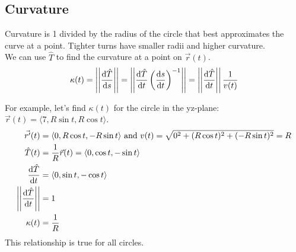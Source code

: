 \subsection{Curvature}
Curvature is 1 divided by the radius of the circle that best approximates the curve at a point. Tighter turns have smaller radii and higher curvature.\\
We can use $\hat{T}$ to find the curvature at a point on $\vec{r}(t)$.\\
\begin{equation*}
	\kappa(t) = \left|\left|\frac{\mathrm{d}\hat{T}}{\mathrm{d}s}\right|\right| = \left|\left|\frac{\mathrm{d}\hat{T}}{\mathrm{d}t}\left(\frac{\mathrm{d}s}{\mathrm{d}t}\right)^{-1}\right|\right| = \left|\left|\frac{\mathrm{d}\hat{T}}{\mathrm{d}t}\right|\right|\frac{1}{v(t)}
\end{equation*}

\noindent
For example, let's find $\kappa(t)$ for the circle in the yz-plane: $\vec{r}(t)=\langle 7, R\sin{t}, R\cos{t} \rangle$.
\begin{align*}
	\vec{r^\prime}(t) &= \langle 0, R\cos{t}, -R\sin{t}\rangle
	\text{ and }
	v(t) = \sqrt{0^2+(R\cos{t})^2+(-R\sin{t})^2} = R \\
	\hat{T}(t) &= \frac{1}{R}\vec{r}(t) = \langle0,\cos{t},-\sin{t}\rangle \\
	\frac{\mathrm{d}\hat{T}}{\mathrm{d}t} &= \langle 0,\sin{t},-\cos{t}\rangle \\
	\left|\left|\frac{\mathrm{d}\hat{T}}{\mathrm{d}t}\right|\right| &= 1 \\
	\kappa(t) &= \frac{1}{R}
\end{align*}
This relationship is true for all circles.